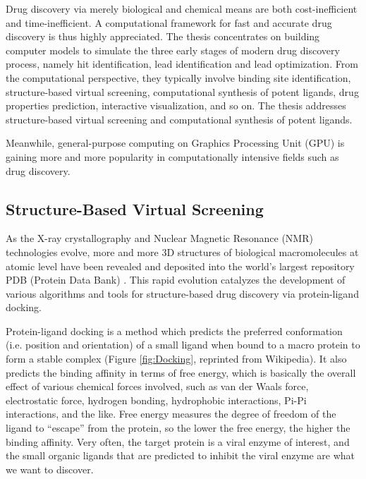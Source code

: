 Drug discovery via merely biological and chemical means are both cost-inefficient and time-inefficient. A computational framework for fast and accurate drug discovery is thus highly appreciated. The thesis concentrates on building computer models to simulate the three early stages of modern drug discovery process, namely hit identification, lead identification and lead optimization. From the computational perspective, they typically involve binding site identification, structure-based virtual screening, computational synthesis of potent ligands, drug properties prediction, interactive visualization, and so on. The thesis addresses structure-based virtual screening and computational synthesis of potent ligands.

Meanwhile, general-purpose computing on Graphics Processing Unit (GPU) is gaining more and more popularity in computationally intensive fields such as drug discovery.

\subsection{Structure-Based Virtual Screening}

As the X-ray crystallography and Nuclear Magnetic Resonance (NMR) technologies evolve, more and more 3D structures of biological macromolecules at atomic level have been revealed and deposited into the world's largest repository PDB (Protein Data Bank) \citep{540,539,537,105,538}. This rapid evolution catalyzes the development of various algorithms and tools for structure-based drug discovery via protein-ligand docking.

Protein-ligand docking is a method which predicts the preferred conformation (i.e. position and orientation) of a small ligand when bound to a macro protein to form a stable complex (Figure \ref{fig:Docking}, reprinted from Wikipedia). It also predicts the binding affinity in terms of free energy, which is basically the overall effect of various chemical forces involved, such as van der Waals force, electrostatic force, hydrogen bonding, hydrophobic interactions, Pi-Pi interactions, and the like. Free energy measures the degree of freedom of the ligand to ``escape'' from the protein, so the lower the free energy, the higher the binding affinity. Very often, the target protein is a viral enzyme of interest, and the small organic ligands that are predicted to inhibit the viral enzyme are what we want to discover.


